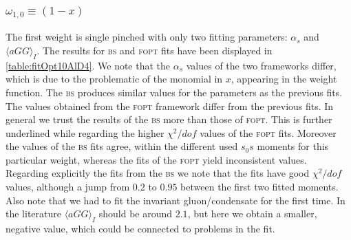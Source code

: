 \documentclass[../../index.tex]{subfiles}
\begin{document}
\subsubsection{\(\omega_{1,0} \equiv (1-x)\)}
The first weight is single pinched with only two fitting parameters:
\(\alpha_s\) and \(\langle aGG \rangle_I\). The results for \textsc{bs} and
\textsc{fopt} fits have been displayed in \cref{table:fitOpt10AlD4}. We note
that the \(\alpha_s\) values of the two frameworks differ, which is due to the
problematic of the monomial in \(x\), appearing in the weight function. The
\textsc{bs} produces similar values for the parameters as the previous fits. The
values obtained from the \textsc{fopt} framework differ from the previous fits.
In general we trust the results of the \textsc{bs} more than those of
\textsc{fopt}. This is further underlined while regarding the higher
\(\chi^2/dof\) values of the \textsc{fopt} fits. Moreover the values of the
\textsc{bs} fits agree, within the different used \(s_0s\) moments for this
particular weight, whereas the fits of the \textsc{fopt} yield inconsistent
values. Regarding explicitly the fits from the \textsc{bs} we note that the fits
have good \(\chi^2/dof\) values, although a jump from \(0.2\) to \(0.95\)
between the first two fitted moments. Also note that we had to fit the invariant
gluon\-/condensate for the first time. In the literature \(\langle aGG
\rangle_I\) should be around \(2.1\), but here we obtain a smaller, negative
value, which could be connected to problems in the fit.
\end{document}
